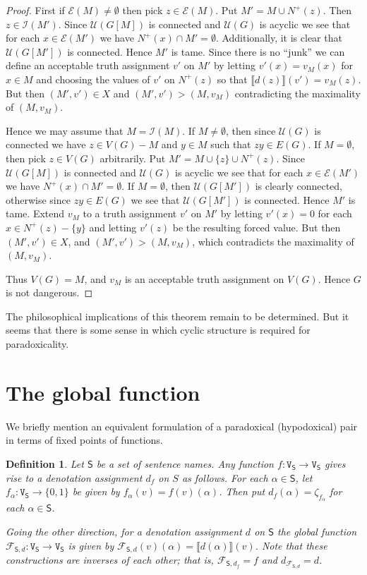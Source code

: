 \documentclass[12pt]{kluwer}
\newtheorem{defn}{Definition}
\theoremstyle{remark}
\newcommand{\fancy}[1]{\mathcal{#1}}
\def\S{\textsf{S}}
\def\V{\texttt{V}}
\def\F{\fancy{F}}
\def\I{\fancy{I}}
\def\U{\fancy{U}}
\def\E{\fancy{E}}
\def\F{\fancy{F}}
\begin{document}
\begin{proof}
First if $\E(M) \neq \emptyset$ then pick $z \in \E(M)$.  Put $M' = M \cup N^+(z)$.  Then $z \in \I(M')$. Since $\U(G[M])$ is connected and $\U(G)$ is acyclic we see that for each $x \in \E(M')$ we have $N^+(x) \cap M' = \emptyset$.  Additionally, it is clear that $\U(G[M'])$ is connected.  Hence $M'$ is tame.  Since there is no ``junk'' we can define an acceptable truth assignment $v'$ on $M'$ by letting $v'(x) = v_M(x)$ for $x \in M$ and choosing the values of $v'$ on $N^+(z)$ so that $\llbracket d(z) \rrbracket(v') = v_M(z)$.  But then $(M', v') \in X$ and $(M', v') > (M, v_M)$ contradicting the maximality of $(M, v_M)$.\newline

Hence we may assume that $M = \I(M)$.  If $M \neq \emptyset$, then since $\U(G)$ is connected we have $z \in V(G) - M$ and $y \in M$ such that $zy \in E(G)$.  If $M = \emptyset$, then pick $z \in V(G)$ arbitrarily. Put $M' = M \cup \{z\} \cup N^+(z)$.  Since $\U(G[M])$ is connected and $\U(G)$ is acyclic we see that for each $x \in \E(M')$ we have $N^+(x) \cap M' = \emptyset$.  If $M = \emptyset$, then $\U(G[M'])$ is clearly connected, otherwise since $zy \in E(G)$ we see that $\U(G[M'])$ is connected.  Hence $M'$ is tame.  Extend $v_M$ to a truth assignment $v'$ on $M'$ by letting $v'(x) = 0$ for each $x \in N^+(z) - \{y\}$ and letting $v'(z)$ be the resulting forced value.  But then $(M', v') \in X$, and $(M', v') > (M, v_M)$, which contradicts the maximality of $(M, v_M)$.\newline

Thus $V(G) = M$, and $v_M$ is an acceptable truth assignment on $V(G)$.  Hence $G$ is not dangerous. 
\end{proof}

The philosophical implications of this theorem remain to be determined. But it seems that there is some sense in which cyclic structure is required for paradoxicality.

\appendix

\section{The global function}
\label{sec7}

We briefly mention an equivalent formulation of a paradoxical (hypodoxical) pair in terms of fixed points of functions.

\begin{defn}
Let $\S$ be a set of sentence names. Any function $f: \V_\S \rightarrow \V_\S$ gives rise to a denotation assignment $d_f$ on $S$ as follows.  For each $\alpha \in \S$, let $f_{\alpha}: \V_\S \rightarrow \{0, 1\}$ be given by $f_{\alpha}(v) = f(v)(\alpha)$.  Then put $d_f(\alpha) = \zeta_{f_{\alpha}}$ for each $\alpha \in \S$.

Going the other direction, for a denotation assignment $d$ on $\S$ the \emph{global function} $\F_{\S, d} :\V_\S \rightarrow \V_\S$ is given by $\F_{\S, d}(v)(\alpha) = \llbracket d(\alpha) \rrbracket(v)$. Note that these constructions are inverses of each other; that is, $\F_{\S, d_f} = f$ and $d_{\F_{\S, d}} = d$.
\end{defn}
\end{document}
